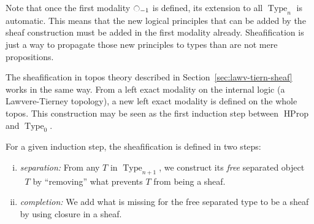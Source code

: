 \documentclass[conference]{IEEEtran}
\newcommand{\mynote}[2]{
    \fbox{\bfseries\sffamily\scriptsize#1}
    {\small$\blacktriangleright$\textsf{\emph{#2}}$\blacktriangleleft$}~}
\newcommand\kq[1]{\mynote{KQ}{#1}}
\DeclareMathOperator{\Type}{Type}
\DeclareMathOperator{\HProp}{HProp}
\newcommand{\modal}{\ensuremath{\ocircle}}
\newcommand \separated {\mathop{\square_{n+1}} }
\begin{document}
Note that once the first modality $\modal_{-1}$ is defined, its
extension to all $\Type_n$ is automatic. This means that the new
logical principles that can be added by the sheaf construction must be
added in the first modality already. Sheafification is just a way
to propagate those new principles to types than are not mere
propositions.





The sheafification in topos theory described in
Section~\ref{sec:lawv-tiern-sheaf} works in the same way. 
%
From a left exact modality on the internal logic (a Lawvere-Tierney
topology), a new left exact modality is defined on the whole topos.
%
This construction may be seen as the first induction step between
$\HProp$ and $\Type_0$. 


For a given induction step, the sheafification is defined in two
steps:
%
\begin{enumerate}[(i)]
\item {\em separation:} From any $T$ in $\Type_{n+1}$, we construct
  its {\em free} separated object $\separated T$ by ``removing'' what
  prevents $T$ from being a sheaf.
\item {\em completion:} We add what is missing for the free 
  separated type to be a sheaf by using closure in a sheaf.
\end{enumerate}



\end{document}
